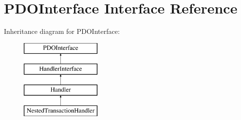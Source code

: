 \hypertarget{interface_pes_1_1_database_1_1_handler_1_1_p_d_o_interface}{}\section{P\+D\+O\+Interface Interface Reference}
\label{interface_pes_1_1_database_1_1_handler_1_1_p_d_o_interface}
Inheritance diagram for P\+D\+O\+Interface\+:\begin{figure}[H]
\begin{center}
\leavevmode
\includegraphics[height=4.000000cm]{interface_pes_1_1_database_1_1_handler_1_1_p_d_o_interface}
\end{center}
\end{figure}
